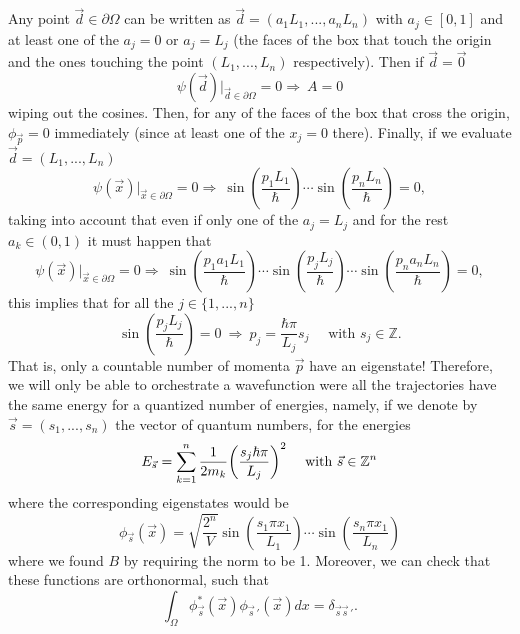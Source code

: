 \documentclass[11pt, a4paper]{article} %
\newcommand{\Z}{\mathbb{Z}} %
\begin{document}
Any point $\vec{d}\in\partial \Omega$ can be written as $\vec{d}=(a_1L_1,...,a_nL_n)$ with $a_j\in[0,1]$ and at least one of the $a_j=0$ or $a_j=L_j$ (the faces of the box that touch the origin and the ones touching the point $(L_1,...,L_n)$ respectively). Then if $\vec{d}=\vec{0}$
\begin{equation}
\psi(\vec{d})\Big\rvert_{\vec{d}\in\partial \Omega}=0\Longrightarrow \ A=0
\end{equation}
wiping out the cosines. Then, for any of the faces of the box that cross the origin, $\phi_{\vec{p}}=0$ immediately (since at least one of the $x_j=0$ there). Finally, if we evaluate $\vec{d}=(L_1,...,L_n)$ 
\begin{equation}
\psi(\vec{x})\Big\rvert_{\vec{x}\in\partial \Omega}=0\Longrightarrow \ \sin(\frac{p_1L_1}{\hbar})\cdots \sin(\frac{p_nL_n}{\hbar})=0,
\end{equation}
taking into account that even if only one of the $a_j=L_j$ and for the rest $a_k\in(0,1)$ it must happen that
\begin{equation}
\psi(\vec{x})\Big\rvert_{\vec{x}\in\partial \Omega}=0\Longrightarrow \ \sin(\frac{p_1a_1L_1}{\hbar})\cdots\sin(\frac{p_jL_j}{\hbar})\cdots \sin(\frac{p_na_nL_n}{\hbar})=0,
\end{equation}
this implies that for all the $j\in\{1,...,n\}$
\begin{equation}
\sin(\frac{p_jL_j}{\hbar})=0\ \Longrightarrow\  p_j=\frac{\hbar\pi}{L_j}s_j\quad \text{ with }s_j\in\Z.
\end{equation}
That is, only a countable number of momenta $\vec{p}$ have an eigenstate! Therefore, we will only be able to orchestrate a wavefunction were all the trajectories have the same energy for a quantized number of energies, namely, if we denote by $\vec{s}=(s_1,...,s_n)$ the vector of quantum numbers, for the energies
\begin{equation}
E_{\vec{s}} = \sum_{k=1}^n\frac{1}{2m_k} \qty(\frac{s_j\hbar \pi}{L_j})^2 \quad \text{ with }\vec{s}\in\Z^n
\end{equation}
where the corresponding eigenstates would be
\begin{equation}
\phi_{\vec{s}}(\vec{x})=\sqrt{\frac{2^n}{V}}\sin(\frac{s_1\pi x_1}{L_1})\cdots \sin(\frac{s_n\pi x_1}{L_n})
\end{equation}
where we found $B$ by requiring the norm to be 1. Moreover, we can check that these functions are orthonormal, such that
\begin{equation}
\int_{\Omega}\phi^*_{\vec{s}}(\vec{x})\phi_{\vec{s}\,'}(\vec{x})dx=\delta_{\vec{s}\vec{s}\,'}.
\end{equation}
\end{document}
